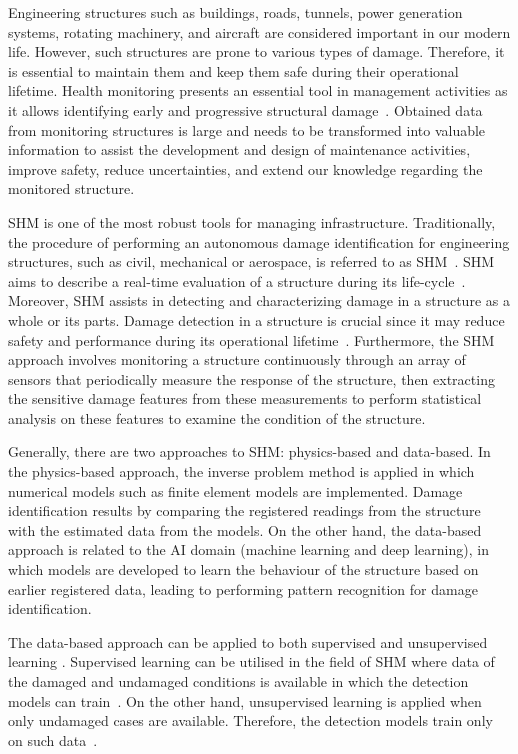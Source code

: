 Engineering structures such as buildings, roads, tunnels, power generation systems, rotating machinery, and aircraft are considered important in our modern life.
However, such structures are prone to various types of damage.
Therefore, it is essential to maintain them and keep them safe during their operational lifetime.
Health monitoring presents an essential tool in management activities as it allows identifying early and progressive structural damage~\cite{Farrar2007}. 
Obtained data from monitoring structures is large and needs to be transformed into valuable information to assist the development and design of maintenance activities, improve safety, reduce uncertainties, and extend our knowledge regarding the monitored structure.

SHM is one of the most robust tools for managing infrastructure.
Traditionally, the procedure of performing an autonomous damage identification for engineering structures, such as civil, mechanical or aerospace, is referred to as SHM~\cite{farrar2001vibration}.
SHM aims to describe a real-time evaluation of a structure during its life-cycle~\cite{Balageas2010}. 
Moreover, SHM assists in detecting and characterizing damage in a structure as a whole or its parts. 
Damage detection in a structure is crucial since it may reduce safety and performance during its operational lifetime~\cite{Yuan2016}.
Furthermore, the SHM approach involves monitoring a structure continuously through an array of sensors that periodically measure the response of the structure, then extracting the sensitive damage features from these measurements to perform statistical analysis on these features to examine the condition of the structure.

Generally, there are two approaches to SHM: physics-based and
data-based.
In the physics-based approach, the inverse problem method is applied in which numerical models such as finite element models are implemented.
Damage identification results by comparing the registered readings from the structure with the estimated data from the models.
On the other hand, the data-based approach is related to the AI domain (machine learning and deep learning), in which models are developed to learn the behaviour of the structure based on earlier registered data, leading to performing pattern recognition for damage identification.

The data-based approach can be applied to both supervised and unsupervised learning \cite{worden2007application}.
Supervised learning can be utilised in the field of SHM where data of the damaged and undamaged conditions is available in which the detection models can train~\cite{figueiredo2018machine}.
On the other hand, unsupervised learning is applied when only undamaged cases are available.
Therefore, the detection models train only on such data~\cite{figueiredo2018machine}.






%
%